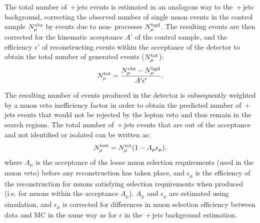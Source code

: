 The total number of \wmunubr{}\,+\,jets events is estimated in an analogous way to the \znunubr{}\,+\,jets background,
correcting the observed number of single muon events in the control sample $N^{\rm obs}_{\mu}$ by events due to non-\wpj{} processes $N^{\rm bgd}_{\mu}$.  
The resulting \wmunu events are then corrected for the kinematic acceptance $A'$ of the control sample, and the efficiency $\epsilon'$ of reconstructing events within the acceptance of the detector to obtain the total number of generated events ($N^{\rm tot}_{\mu}$):
\begin{equation}
N^{\rm tot}_{\mu} = \frac{N^{\rm obs}_{\mu} - N^{\rm bgd}_{\mu}}{A'\epsilon'}.\label{eqn:Ntot}
\end{equation}

The resulting number of \wmunu events produced in the detector is subsequently weighted by a muon veto inefficiency factor in order to obtain the predicted number of \wmunubr{}\,+\,jets events that would not be rejected by the lepton veto and thus remain in the search regions.
%
The total number of \wmunubr{}\,+\,jets events that are out of the acceptance and not identified or isolated can be written as:
\begin{equation}
N^{\rm lost}_{\mu} = N^{\rm tot}_{\mu}(1 - A_{\mu}\epsilon_{\mu}).
\end{equation}
where $A_{\mu}$ is the acceptance of the loose muon selection requirements (used in the muon veto) before any reconstruction has taken place, 
and $\epsilon_{\mu}$ is the efficiency of the reconstruction for muons satisfying selection requirements when produced (i.e. for muons within the acceptance $A_{\mu}$).
$A_{\mu}$ and $\epsilon_{\mu}$ are estimated using simulation, and $\epsilon_{\mu}$ is corrected for differences in muon selection efficiency between data and MC in the same way as for $\epsilon$ in the \znunubr{}\,+\,jets background estimation.

